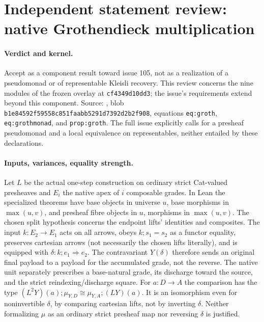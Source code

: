 \documentclass{article}
\begin{document}
\section*{Independent statement review: native Grothendieck multiplication}
\paragraph{Verdict and kernel.}
Accept as a component result toward issue 105, not as a realization of a pseudomonad or of representable Kleisli recovery. This review concerns the nine modules of the frozen overlay at \texttt{cf4349d10dd3}; the issue's requirements extend beyond this component. Source: , blob \texttt{b1e84592f59558c851faabb5291d7392d2b2f908}, equations \texttt{eq:groth}, \texttt{eq:grothmonad}, and \texttt{prop:groth}. The full issue explicitly calls for a presheaf pseudomonad and a local equivalence on representables, neither entailed by these declarations.
\paragraph{Inputs, variances, equality strength.}
Let $L$ be the actual one-step construction on ordinary strict Cat-valued presheaves and $E_i$ the native apex of $i$ composable grades. In Lean the specialized theorems have base objects in universe $u$, base morphisms in $\max(u,v)$, and presheaf fibre objects in $u$, morphisms in $\max(u,v)$. The chosen split hypothesis concerns the endpoint lifts' identities and composites. The input $k:E_2\to E_1$ acts on all arrows, obeys $k;s_1=s_2$ as a functor equality, preserves cartesian arrows (not necessarily the chosen lifts literally), and is equipped with $\delta:k;e_1\Rightarrow e_2$. The contravariant $Y(\delta)$ therefore sends an original final payload to a payload for the accumulated grade, not the reverse. The native unit separately prescribes a base-natural grade, its discharge toward the source, and the strict reindexing/discharge square. For $a:D\to A$ the comparison has the type $(L^2Y)(a);\mu_{Y,D}\cong\mu_{Y,A};(LY)(a)$. It is an isomorphism even for noninvertible $\delta$, by comparing cartesian lifts, not by inverting $\delta$. Neither formalizing $\mu$ as an ordinary strict presheaf map nor reversing $\delta$ is justified.
\end{document}
